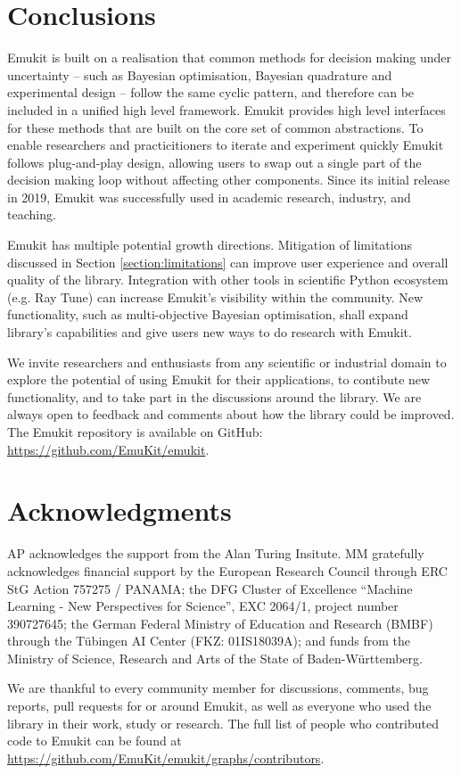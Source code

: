 \section{Conclusions}
Emukit is built on a realisation that common methods for decision making under uncertainty -- such as Bayesian optimisation, Bayesian quadrature and experimental design -- follow the same cyclic pattern, and therefore can be included in a unified high level framework. Emukit provides high level interfaces for these methods that are built on the core set of common abstractions. To enable researchers and practicitioners to iterate and experiment quickly Emukit follows plug-and-play design, allowing users to swap out a single part of the decision making loop without affecting other components. Since its initial release in 2019, Emukit was successfully used in academic research, industry, and teaching.

Emukit has multiple potential growth directions. Mitigation of limitations discussed in Section \ref{section:limitations} can improve user experience and overall quality of the library. Integration with other tools in scientific Python ecosystem (e.g. Ray Tune) can increase Emukit's visibility within the community. New functionality, such as multi-objective Bayesian optimisation, shall expand library's capabilities and give users new ways to do research with Emukit.

We invite researchers and enthusiasts from any scientific or industrial domain to explore the potential of using Emukit for their applications, to contibute new functionality, and to take part in the discussions around the library. We are always open to feedback and comments about how the library could be improved. The Emukit repository is available on GitHub: \url{https://github.com/EmuKit/emukit}.

\section{Acknowledgments}
AP acknowledges the support from the Alan Turing Insitute.  MM gratefully acknowledges financial support by the European Research Council through ERC StG Action 757275 / PANAMA; the DFG Cluster of Excellence “Machine Learning - New Perspectives for Science”, EXC 2064/1, project number 390727645; the German Federal Ministry of Education and Research (BMBF) through the T\"{u}bingen AI Center (FKZ: 01IS18039A); and funds from the Ministry of Science, Research and Arts of the State of Baden-W\"{u}rttemberg.

We are thankful to every community member for discussions, comments, bug reports, pull requests for or around Emukit, as well as everyone who used the library in their work, study or research. The full list of people who contributed code to Emukit can be found at \url{https://github.com/EmuKit/emukit/graphs/contributors}.
